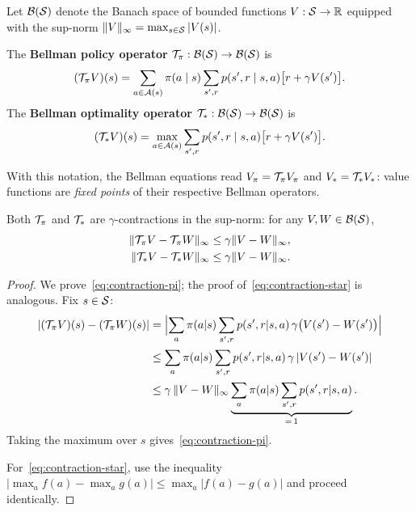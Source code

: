 \begin{definition}
\label{def:bellman-operators}
Let $\mathcal{B}(\mathcal{S})$ denote the Banach space of bounded functions $V : \mathcal{S} \to \mathbb{R}$ equipped with the sup-norm $\|V\|_\infty = \max_{s \in \mathcal{S}} |V(s)|$.

The \textbf{Bellman policy operator} $\mathcal{T}_\pi : \mathcal{B}(\mathcal{S}) \to \mathcal{B}(\mathcal{S})$ is
\begin{equation}
\label{eq:bellman-policy-op}
(\mathcal{T}_\pi V)(s)
= \sum_{a \in \mathcal{A}(s)} \pi(a \mid s)
  \sum_{s', r} p(s', r \mid s, a)\bigl[r + \gamma V(s')\bigr].
\end{equation}
The \textbf{Bellman optimality operator} $\mathcal{T}_* : \mathcal{B}(\mathcal{S}) \to \mathcal{B}(\mathcal{S})$ is
\begin{equation}
\label{eq:bellman-opt-op}
(\mathcal{T}_* V)(s)
= \max_{a \in \mathcal{A}(s)}
  \sum_{s', r} p(s', r \mid s, a)\bigl[r + \gamma V(s')\bigr].
\end{equation}
\end{definition}

With this notation, the Bellman equations read $V_\pi = \mathcal{T}_\pi V_\pi$ and $V_* = \mathcal{T}_* V_*$: value functions are \emph{fixed points} of their respective Bellman operators.

\begin{theorem}
\label{thm:contraction}
Both $\mathcal{T}_\pi$ and $\mathcal{T}_*$ are $\gamma$-contractions in the sup-norm: for any $V, W \in \mathcal{B}(\mathcal{S})$,
\begin{align}
\|\mathcal{T}_\pi V - \mathcal{T}_\pi W\|_\infty &\le \gamma \|V - W\|_\infty, \label{eq:contraction-pi} \\
\|\mathcal{T}_* V - \mathcal{T}_* W\|_\infty &\le \gamma \|V - W\|_\infty. \label{eq:contraction-star}
\end{align}
\end{theorem}

\begin{proof}
We prove~\eqref{eq:contraction-pi}; the proof of~\eqref{eq:contraction-star} is analogous. Fix $s \in \mathcal{S}$:
\begin{align*}
|(\mathcal{T}_\pi V)(s) - (\mathcal{T}_\pi W)(s)|
&= \Bigl|\sum_a \pi(a|s) \sum_{s',r} p(s',r|s,a)\,\gamma\bigl(V(s') - W(s')\bigr)\Bigr| \\
&\le \sum_a \pi(a|s) \sum_{s',r} p(s',r|s,a)\,\gamma\, |V(s') - W(s')| \\
&\le \gamma\, \|V - W\|_\infty
     \underbrace{\sum_a \pi(a|s) \sum_{s',r} p(s',r|s,a)}_{=\,1}.
\end{align*}
Taking the maximum over $s$ gives~\eqref{eq:contraction-pi}.

For~\eqref{eq:contraction-star}, use the inequality $|\max_a f(a) - \max_a g(a)| \le \max_a |f(a) - g(a)|$ and proceed identically.
\end{proof}

